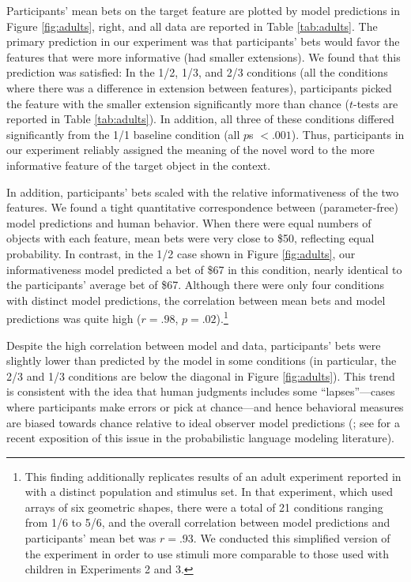 \documentclass[review]{elsarticle}
\begin{document}
Participants' mean bets on the target feature are plotted by model predictions in Figure \ref{fig:adults}, right, and all data are reported in Table \ref{tab:adults}. The primary prediction in our experiment was that participants' bets would favor the features that were more informative (had smaller extensions). We found that this prediction was satisfied: In the 1/2, 1/3, and 2/3 conditions (all the conditions where there was a difference in extension between features), participants picked the feature with the smaller extension significantly more than chance ($t$-tests are reported in Table \ref{tab:adults}). In addition, all three of these conditions differed significantly from the 1/1 baseline condition (all $p$s $< .001$). Thus, participants in our experiment reliably assigned the meaning of the novel word to the more informative feature of the target object in the context. 

In addition, participants' bets scaled with the relative informativeness of the two features. We found a tight quantitative correspondence between (parameter-free) model predictions and human behavior. When there were equal numbers of objects with each feature, mean bets were very close to \$50, reflecting equal probability. In contrast, in the 1/2 case shown in Figure \ref{fig:adults}, our informativeness model predicted a bet of \$67 in this condition, nearly identical to the participants' average bet of \$67. Although there were only four conditions with distinct model predictions, the correlation between mean bets and model predictions was quite high ($r = .98$, $p = .02$).\footnote{This finding additionally replicates results of an adult experiment reported in \citet{frank2009b} with a distinct population and stimulus set. In that experiment, which used arrays of six geometric shapes, there were a total of 21 conditions ranging from 1/6 to 5/6, and the overall correlation between model predictions and participants' mean bet was $r=.93$. We conducted this simplified version of the experiment in order to use stimuli more comparable to those used with children in Experiments 2 and 3.} 

Despite the high correlation between model and data, participants' bets were slightly lower than predicted by the model in some conditions (in particular, the 2/3 and 1/3 conditions are below the diagonal in Figure \ref{fig:adults}). This trend is consistent with the idea that human judgments includes some ``lapses''---cases where participants make errors or pick at chance---and hence behavioral measures are biased towards chance relative to ideal observer model predictions (\citealp{wichmann2001}; see \citealp{frank2010} for a recent exposition of this issue in the probabilistic language modeling literature). 
\end{document}
